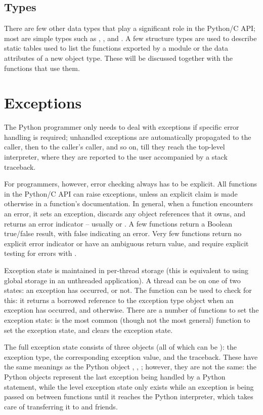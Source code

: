 \documentclass[twoside,openright]{report}
\begin{document}
\subsection{Types}

There are few other data types that play a significant role in 
the Python/C API; most are simple \C{} types such as , 
,  and .  A few structure types 
are used to describe static tables used to list the functions exported 
by a module or the data attributes of a new object type.  These will 
be discussed together with the functions that use them.

\section{Exceptions}

The Python programmer only needs to deal with exceptions if specific 
error handling is required; unhandled exceptions are automatically 
propagated to the caller, then to the caller's caller, and so on, till 
they reach the top-level interpreter, where they are reported to the 
user accompanied by a stack traceback.

For \C{} programmers, however, error checking always has to be explicit.  
All functions in the Python/C API can raise exceptions, unless an 
explicit claim is made otherwise in a function's documentation.  In 
general, when a function encounters an error, it sets an exception, 
discards any object references that it owns, and returns an 
error indicator -- usually \NULL{} or .  A few functions 
return a Boolean true/false result, with false indicating an error.
Very few functions return no explicit error indicator or have an 
ambiguous return value, and require explicit testing for errors with 
.

Exception state is maintained in per-thread storage (this is 
equivalent to using global storage in an unthreaded application).  A 
thread can be on one of two states: an exception has occurred, or not.  
The function  can be used to check for this: it 
returns a borrowed reference to the exception type object when an 
exception has occurred, and \NULL{} otherwise.  There are a number 
of functions to set the exception state:  is 
the most common (though not the most general) function to set the 
exception state, and  clears the exception state.

The full exception state consists of three objects (all of which can 
be \NULL{} ): the exception type, the corresponding exception 
value, and the traceback.  These have the same meanings as the Python 
object , , 
; however, they are not the same: the Python 
objects represent the last exception being handled by a Python 
 statement, while the \C{} level exception state only 
exists while an exception is being passed on between \C{} functions until 
it reaches the Python interpreter, which takes care of transferring it 
to  and friends.
\end{document}
